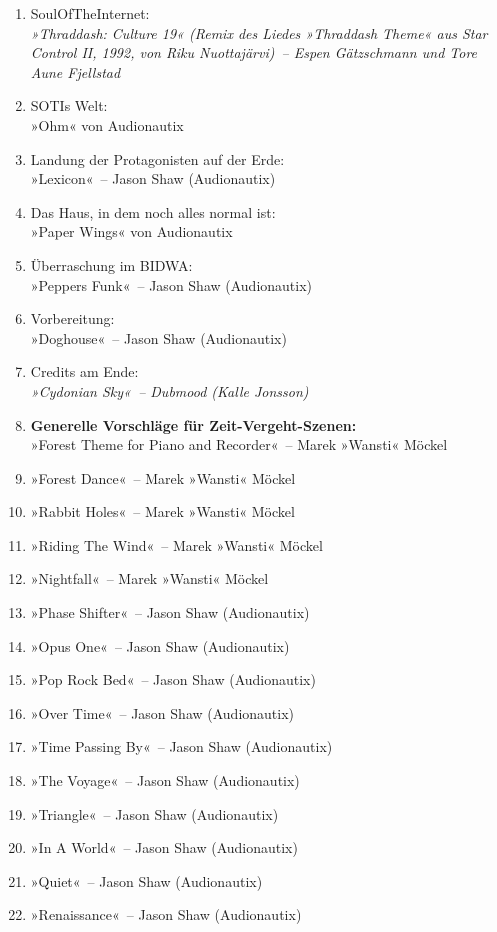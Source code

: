 \begin{enumerate}
    \item SoulOfTheInternet:\\ \textit{»Thraddash: Culture 19« (Remix des Liedes »Thraddash Theme« aus Star Control II, 1992, von Riku Nuottajärvi)~– Espen Gätzschmann und Tore Aune Fjellstad}
    \item SOTIs Welt:\\ »Ohm« von Audionautix
    \item Landung der Protagonisten auf der Erde:\\ »Lexicon«~– Jason Shaw (Audionautix)
    \item Das Haus, in dem noch alles normal ist:\\ »Paper Wings« von Audionautix
    \item Überraschung im BIDWA:\\ »Peppers Funk«~– Jason Shaw (Audionautix)
    \item Vorbereitung:\\ »Doghouse«~– Jason Shaw (Audionautix)
    \item Credits am Ende:\\ \textit{»Cydonian Sky«~– Dubmood (Kalle Jonsson)}
    \item \textbf{Generelle Vorschläge für Zeit-Vergeht-Szenen:}\\ »Forest Theme for Piano and Recorder«~– Marek »Wansti« Möckel
    \item »Forest Dance«~– Marek »Wansti« Möckel
    \item »Rabbit Holes«~– Marek »Wansti« Möckel
    \item »Riding The Wind«~– Marek »Wansti« Möckel
    \item »Nightfall«~– Marek »Wansti« Möckel
    \item »Phase Shifter«~– Jason Shaw (Audionautix)
    \item »Opus One«~– Jason Shaw (Audionautix)
    \item »Pop Rock Bed«~– Jason Shaw (Audionautix)
    \item »Over Time«~– Jason Shaw (Audionautix)
    \item »Time Passing By«~– Jason Shaw (Audionautix)
    \item »The Voyage«~– Jason Shaw (Audionautix)
    \item »Triangle«~– Jason Shaw (Audionautix)
    \item »In A World«~– Jason Shaw (Audionautix)
    \item »Quiet«~– Jason Shaw (Audionautix)
    \item »Renaissance«~– Jason Shaw (Audionautix)

\end{enumerate}
